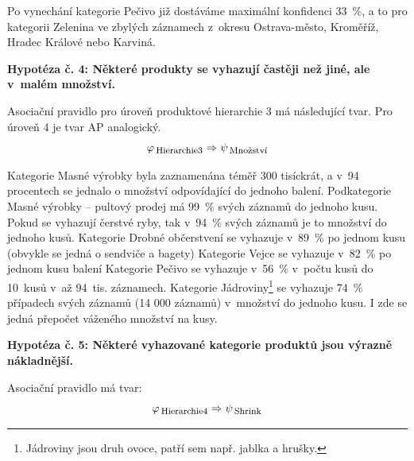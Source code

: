Po vynechání kategorie Pečivo již dostáváme maximální konfidenci 33~\%, a to pro kategorii Zelenina ve zbylých záznamech z~okresu Ostrava-město, Kroměříž, Hradec Králové nebo Karviná.

\vspace*{1em}




\textbf{Hypotéza č. 4: Některé produkty se vyhazují častěji než jiné, ale v~malém množství.}

Asociační pravidlo pro úroveň produktové hierarchie 3 má následující tvar. Pro úroveň 4 je tvar AP analogický.
\begin{equation}
    \varphi_{\mbox{\,\footnotesize Hierarchie3}} \Rightarrow \psi_{\mbox{\,\footnotesize Množství}}
\end{equation}

Kategorie Masné výrobky byla zaznamenána téměř 300 tisíckrát, a v~94 procentech se jednalo o množství odpovídající do jednoho balení. Podkategorie Masné výrobky -- pultový prodej má 99~\% svých záznamů do jednoho kusu.
Pokud se vyhazují čerstvé ryby, tak v~94~\% svých záznamů je to množství do jednoho kusů. Kategorie Drobné občerstvení %
 se vyhazuje v~89~\% po jednom kusu (obvykle se jedná o sendviče a bagety)
Kategorie Vejce se vyhazuje v~82~\% po jednom kusu balení
Kategorie Pečivo se vyhazuje v~56~\% v~počtu kusů do 10~kusů v~až 94~tis. záznamech.
Kategorie Jádroviny\footnote{Jádroviny jsou druh ovoce, patří sem např. jablka a hrušky.} se vyhazuje 74~\% případech svých záznamů (14 000 záznamů) v~množství do jednoho kusu. I zde se jedná přepočet váženého množství na kusy.

\vspace*{1em}

\textbf{Hypotéza č. 5: Některé vyhazované kategorie produktů jsou výrazně nákladnější.}

Asociační pravidlo má tvar:
\begin{equation}
    \varphi_{\mbox{\,\footnotesize Hierarchie4}} \Rightarrow \psi_{\mbox{\,\footnotesize Shrink}}
\end{equation}

